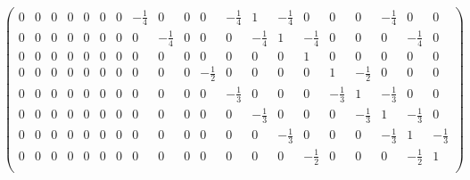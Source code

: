 \documentclass[12 pt, letterpaper]{hmcpset}
\begin{document}
\begin{landscape}
\begin{solution}
\begin{enumerate}
\[{\begin{pmatrix}
   0 &    0 &    0 &    0 &    0 &    0 &    0 & -\frac{1}{4} &    0 &    0 &    0 & -\frac{1}{4} &    1 & -\frac{1}{4} &    0 &    0 &    0 & -\frac{1}{4} &    0 &    0  \\
   0 &    0 &    0 &    0 &    0 &    0 &    0 &    0 & -\frac{1}{4} &    0 &    0 &    0 & -\frac{1}{4} &    1 & -\frac{1}{4} &    0 &    0 &    0 & -\frac{1}{4} &    0 \\
   0 &    0 &    0 &    0 &    0 &    0 &    0 &    0 &    0 &    0 &    0 &    0 &    0 &    0 &    1 &    0 &    0 &    0 &    0 &    0  \\
   0 &    0 &    0 &    0 &    0 &    0 &    0 &    0 &    0 &    0 & -\frac{1}{2} &    0 &    0 &    0 &    0 &    1 & -\frac{1}{2} &    0 &    0 &    0  \\
   0 &    0 &    0 &    0 &    0 &    0 &    0 &    0 &    0 &    0 &    0 & -\frac{1}{3} &    0 &    0 &    0 & -\frac{1}{3} &    1 & -\frac{1}{3} &    0 &    0  \\
   0 &    0 &    0 &    0 &    0 &    0 &    0 &    0 &    0 &    0 &    0 &    0 & -\frac{1}{3} &    0 &    0 &    0 & -\frac{1}{3} &    1 & -\frac{1}{3} &    0  \\
   0 &    0 &    0 &    0 &    0 &    0 &    0 &    0 &    0 &    0 &    0 &    0 &    0 & -\frac{1}{3} &    0 &    0 &    0 & -\frac{1}{3} &    1 & -\frac{1}{3} \\
   0 &    0 &    0 &    0 &    0 &    0 &    0 &    0 &    0 &    0 &    0 &    0 &    0 &    0 & -\frac{1}{2} &    0 &    0 &    0 & -\frac{1}{2} &    1 \\
 

\end{pmatrix}}\]
\end{enumerate}
\end{solution}
\end{landscape}
\end{document}
